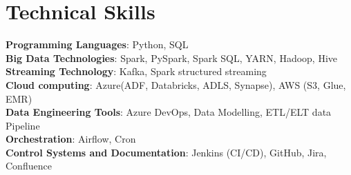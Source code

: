 \documentclass[letterpaper,11pt]{article}
\begin{document}
\section{Technical Skills}
 \begin{itemize}[leftmargin=0.15in, label={}]
    \small{\item{
     \textbf{Programming Languages}{:\hspace{0.06cm}  Python, SQL} \\
     \textbf{Big Data Technologies}{:\hspace{0.49cm}     Spark, PySpark, Spark SQL, YARN, Hadoop, Hive } \\
     \textbf{Streaming Technology}{:\hspace{0.51cm} Kafka, Spark structured streaming} \\
     \textbf{Cloud computing}{:\hspace{1.38cm} Azure(ADF, Databricks, ADLS, Synapse), AWS (S3, Glue, EMR) } \\
     \textbf{Data Engineering Tools}{:\hspace{0.28cm} Azure DevOps, Data Modelling, ETL/ELT data Pipeline}\\
     \textbf{Orchestration}{:\hspace{2.02cm} Airflow, Cron} \\
     \textbf{Control Systems and Documentation}{:\hspace{0.28cm} Jenkins (CI/CD), GitHub, Jira, Confluence} \\     
        
     
    }}
 \end{itemize}

\end{document}
